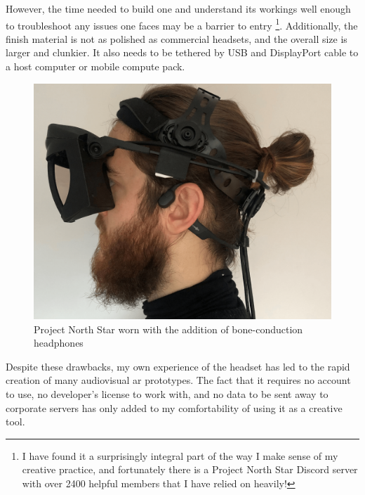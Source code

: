 However, the time needed to build one and understand its workings well enough to trouble\-shoot any issues one faces may be a barrier to entry \footnote{I have found it a surprisingly integral part of the way I make sense of my creative practice, and fortunately there is a Project North Star Discord server with over 2400 helpful members that I have relied on heavily!}. Additionally, the finish material is not as polished as commercial headsets, and the overall size is larger and clunkier. It also needs to be tethered by USB and DisplayPort cable to a host computer or mobile compute pack.

\begin{figure}
    \vspace{-\intextsep}
    \hfill
    \begin{minipage}{0.95\linewidth}
            \includegraphics[width=\linewidth]{figures/06-polaris/polaris-framework-hardware-bc.png}
            \captionsetup{justification=justified}
            \caption{Project North Star worn with the addition of bone-conduction headphones}\label{fig: polaris-framework-hardware-bc}
    \end{minipage}
\end{figure}
Despite these drawbacks, my own experience of the headset has led to the rapid creation of many audiovisual \gls{ar} prototypes. The fact that it requires no account to use, no developer's license to work with, and no data to be sent away to corporate servers has only added to my comfortability of using it as a creative tool.

